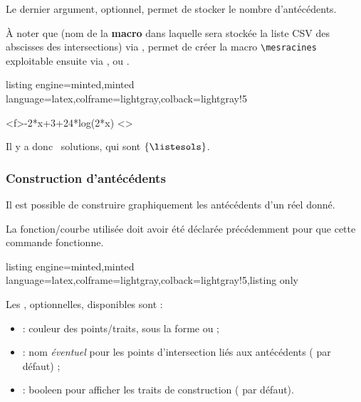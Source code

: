 \documentclass[11pt,a4paper]{ltxdoc}
\begin{document}
Le dernier argument, optionnel, permet de stocker le nombre d'antécédents.

\medskip

À noter que  (nom de la \textbf{macro} dans laquelle sera stockée
la liste CSV des abscisses des intersections) via , permet de créer
la macro \verb|\mesracines| exploitable ensuite via
,
 ou
.

\begin{tcblisting}{listing engine=minted,minted language=latex,colframe=lightgray,colback=lightgray!5}
\begin{GraphiqueTikz}%
  [x=0.9cm,y=0.425cm,Xmin=4,Xmax=20,Origx=4,
  Ymin=46,Ymax=56,Ygrille=2,Ygrilles=1,Origy=46]
  \DefinirCourbe[Nom=cf,Debut=5,Fin=19,Trace,Couleur=red]<f>{-2*x+3+24*log(2*x)}
  <\nbsols>
\end{GraphiqueTikz}

Il y a donc \nbsols\ solutions, qui sont
$\left\lbrace \listesols\right\rbrace$.
\end{tcblisting}

\pagebreak

\subsubsection{Construction d'antécédents}\label{tracanteced}

Il est possible de construire graphiquement les antécédents d'un réel donné.

La fonction/courbe utilisée doit avoir été déclarée précédemment pour que cette commande fonctionne.

\begin{tcblisting}{listing engine=minted,minted language=latex,colframe=lightgray,colback=lightgray!5,listing only}
\end{tcblisting}

Les \MontreCode{[clés]}, optionnelles, disponibles sont :

\smallskip

\begin{itemize}
  \item {} : couleur des points/traits, sous la forme  ou  ;
  \item {} : nom \textit{éventuel} pour les points d'intersection liés aux antécédents ( par défaut) ;
  \item {} : booleen pour afficher les traits de construction ( par défaut).
\end{itemize}
\end{document}
